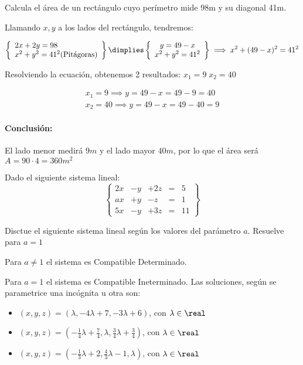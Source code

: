 \documentclass[palatino,nosec,nochap,nobuilddate]{Docencia}
\begin{document}
\begin{problem}
Calcula el área de un rectángulo cuyo perímetro mide 98m y su diagonal 41m.

\solution

Llamando $x,y$ a los lados del rectángulo, tendremos:

\[
\left\{
	\begin{array}{l}
		2x+2y = 98\\
		x^2+y^2 = 41^2 \text{(Pitágoras)}
	\end{array}
\right\} \dimplies 
\left\{
	\begin{array}{c}
		y = 49-x\\
		x^2+y^2 = 41^2 
	\end{array}
\right\} \implies x^2 + (49-x)^2  = 41^2
\]

Resolviendo la ecuación, obtenemos 2 resultados: $x_1 = 9\; x_2=40$

\[
	\begin{array}{c}
		x_1 = 9 \implies y=49-x = 49-9 = 40\\
		x_2 = 40 \implies y=49-x = 49-40 = 9
	\end{array}
\]

\paragraph{Conclusión: } El lado menor medirá $9m$ y el lado mayor $40m$, por lo que el área será $A = 90·4 = 360m^2$

\end{problem}

\begin{problem}
Dado el siguiente sistema lineal:
\[
	\left\{
	\begin{array}{ccccl}
		2x&-y&+2z &= &5\\
		ax&+y&-z& = &1\\
		5x&-y&+3z& = &11
	\end{array}
	\right\}
\]

\ppart Disctue el siguiente sistema lineal según los valores del parámetro $a$.
\ppart Resuelve para $a=1$

\solution


Para $a\neq 1$ el sistema es Compatible Determinado.

Para $a=1$ el sistema es Compatible Ineterminado. Las soluciones, según se parametrice una incógnita u otra son:
\begin{itemize}
	\item $(x,y,z) = (\lambda,-4\lambda+7,-3\lambda+6)$,  con $\lambda\in\real$
	\item $(x,y,z) = \left(-\frac{1}{4}\lambda +\frac{7}{4},\lambda, \frac{3}{4}\lambda + \frac{3}{4}\right)$, con $\lambda\in\real$
	\item $(x,y,z) = \left(-\frac{1}{3}\lambda + 2, \frac{4}{3}\lambda - 1 ,\lambda\right)$, con $\lambda\in\real$
\end{itemize}



\end{problem}
\end{document}
